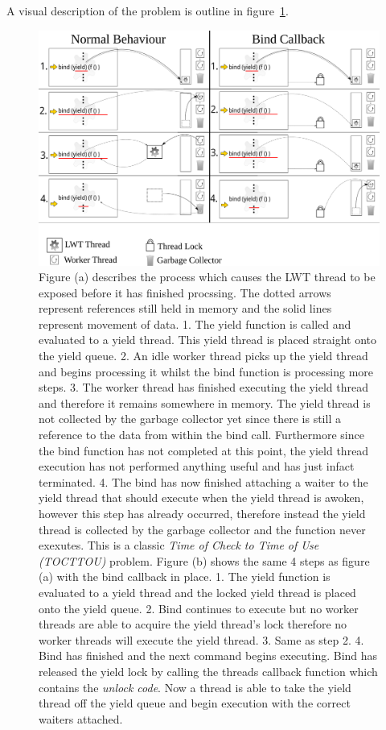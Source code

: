 \documentclass[12pt,twoside,notitlepage]{report}
\begin{document}
A visual description of the problem is outline in figure~\ref{fig:bind_callback}.
\begin{figure}[h!]
\includegraphics[width=\linewidth]{bind_callback}
\caption{Figure (a) describes the process which causes the LWT thread to be exposed before it has finished procssing. The dotted arrows represent references still held in memory and the solid lines represent movement of data. 1. The
yield function is called and evaluated to a yield thread. This yield thread is placed straight onto the yield queue. 2. An idle worker thread picks up the yield thread and begins processing it whilst the bind function is processing
more steps. 3. The worker thread has finished executing the yield thread and therefore it remains somewhere in memory. The yield thread is not collected by the garbage collector yet since there is still a reference to the data from
within the bind call. Furthermore since the bind function has not completed at this point, the yield thread execution has not performed anything useful and has just infact terminated. 4. The bind has now finished attaching a waiter to
the yield thread that should execute when the yield thread is awoken, however this step has already occurred, therefore instead the yield thread is collected by the garbage collector and the function never exexutes. This is a classic
{\em Time of Check to Time of Use (TOCTTOU)} problem. Figure (b) shows the same 4 steps as figure (a) with the bind callback in place. 1. The yield function is evaluated to a yield thread and the locked yield thread is placed onto the
yield queue. 2. Bind continues to execute but no worker threads are able to acquire the yield thread's lock therefore no worker threads will execute the yield thread. 3. Same as step 2. 4. Bind has finished and the next command begins
executing. Bind has released the yield lock by calling the threads callback function which contains the {\em unlock code}. Now a thread is able to take the yield thread off the yield queue and begin execution with the correct waiters
attached.}

\label{fig:bind_callback}
\end{figure}
\end{document}
